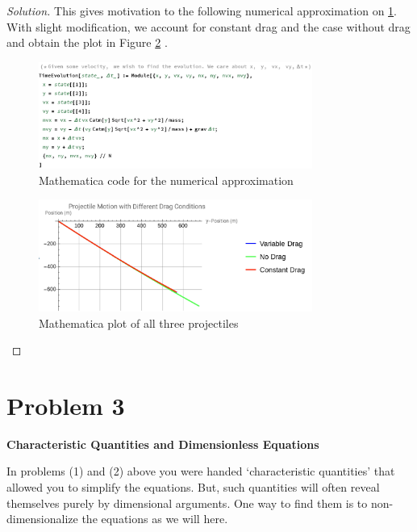 \documentclass{article}
\numberwithin{equation}{section}
\begin{document}
\begin{proof}[Solution]
    This gives motivation to the following numerical approximation on \ref{fig:Q3code}. 
    With slight modification, we account for constant drag and the 
    case without drag and obtain the plot in Figure \ref{fig:Q3AllProjectiles}
   .  
    \begin{figure}[h]
        \centering
        \includegraphics[width=0.8\textwidth]{Q3Code.png} %
        \caption{Mathematica code for the numerical approximation}
        \label{fig:Q3code}
    \end{figure}
    \begin{figure}[h]
        \centering
        \includegraphics[width=0.8\textwidth]{Q3AllProjectiles.png} %
        \caption{Mathematica plot of all three projectiles}
        \label{fig:Q3AllProjectiles}
    \end{figure}
    
    
\end{proof}

\section{Problem 3} 
\textbf{Characteristic Quantities and Dimensionless Equations}

In problems (1) and (2) above you were handed ‘characteristic quantities’ that allowed you to simplify the equations. But, such quantities will often reveal themselves purely by dimensional arguments. One way to find them is to non-dimensionalize the equations as we will here.
\end{document}

